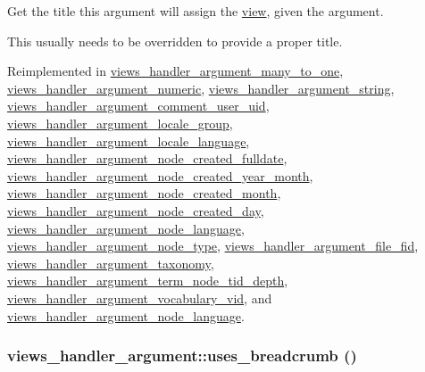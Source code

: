 Get the title this argument will assign the \hyperlink{classview}{view}, given the argument.

This usually needs to be overridden to provide a proper title. 

Reimplemented in \hyperlink{classviews__handler__argument__many__to__one_624565fe59482f017f2f7935037d9297}{views\_\-handler\_\-argument\_\-many\_\-to\_\-one}, \hyperlink{classviews__handler__argument__numeric_480758dbcde899b5483b091e51e2bf39}{views\_\-handler\_\-argument\_\-numeric}, \hyperlink{classviews__handler__argument__string_bd176c527d765826b51c50346309b545}{views\_\-handler\_\-argument\_\-string}, \hyperlink{classviews__handler__argument__comment__user__uid_4e106a92bbbdb88e1207fe525480c18b}{views\_\-handler\_\-argument\_\-comment\_\-user\_\-uid}, \hyperlink{classviews__handler__argument__locale__group_5eb8e22e84904fa604f785484befe86a}{views\_\-handler\_\-argument\_\-locale\_\-group}, \hyperlink{classviews__handler__argument__locale__language_87bfadf6710bcc6bee4f734d258e7407}{views\_\-handler\_\-argument\_\-locale\_\-language}, \hyperlink{classviews__handler__argument__node__created__fulldate_7e071511e9b2523b875b4ba983bbb8f2}{views\_\-handler\_\-argument\_\-node\_\-created\_\-fulldate}, \hyperlink{classviews__handler__argument__node__created__year__month_80dd9527f548e32a8e8f9279fe0ec3d3}{views\_\-handler\_\-argument\_\-node\_\-created\_\-year\_\-month}, \hyperlink{classviews__handler__argument__node__created__month_3dbf8aaf46f210de7c29c36abfb7a2d6}{views\_\-handler\_\-argument\_\-node\_\-created\_\-month}, \hyperlink{classviews__handler__argument__node__created__day_bf71aafe50941da8e9ad6b4e1627833a}{views\_\-handler\_\-argument\_\-node\_\-created\_\-day}, \hyperlink{classviews__handler__argument__node__language_b880be769744ec720d0b8e2e32671daa}{views\_\-handler\_\-argument\_\-node\_\-language}, \hyperlink{classviews__handler__argument__node__type_c17f7b9733895da68b132e6b97dcc917}{views\_\-handler\_\-argument\_\-node\_\-type}, \hyperlink{classviews__handler__argument__file__fid_b6dbcee36a0d890e870b01259f8ed35e}{views\_\-handler\_\-argument\_\-file\_\-fid}, \hyperlink{classviews__handler__argument__taxonomy_330517e71ccc84fe85e871e05640c36d}{views\_\-handler\_\-argument\_\-taxonomy}, \hyperlink{classviews__handler__argument__term__node__tid__depth_d5a2ca190b4b164a810f84f808faa586}{views\_\-handler\_\-argument\_\-term\_\-node\_\-tid\_\-depth}, \hyperlink{classviews__handler__argument__vocabulary__vid_f932cd38cbab2252261bcb077f2d9bd7}{views\_\-handler\_\-argument\_\-vocabulary\_\-vid}, and \hyperlink{classviews__handler__argument__node__language_b880be769744ec720d0b8e2e32671daa}{views\_\-handler\_\-argument\_\-node\_\-language}.\hypertarget{classviews__handler__argument_a22155030bf440ff07a323569f80fd98}{
\subsubsection[{uses\_\-breadcrumb}]{\setlength{\rightskip}{0pt plus 5cm}views\_\-handler\_\-argument::uses\_\-breadcrumb ()}}
